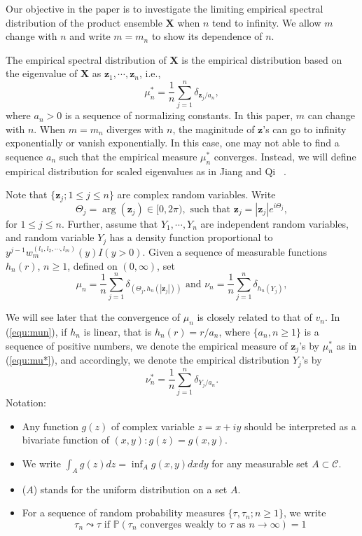 \documentclass[12pt]{article}
\theoremstyle{plain}
\theoremstyle{definition}
\theoremstyle{remark}
\begin{document}
Our objective in the paper is to investigate the limiting empirical
spectral distribution of the product ensemble $\mathbf{X}$ when $n$
tend to infinity. We allow $m$ change with $n$ and write $m=m_n$ to
show its dependence of $n$.


The empirical spectral distribution of $\mathbf{X}$ is the empirical distribution based on the eigenvalue of $\mathbf{X}$ as $\mathbf{z}_{1}, \cdots, \mathbf{z}_{n}$, i.e.,
\begin{equation}\label{equ:mu*}
\mu^*_n=\frac{1}{n}\sum_{j=1}^n \delta_{\mathbf{z}_j/a_n},
\end{equation}
where $a_n>0$ is a sequence of normalizing constants. In this paper,
$m$ can change with $n$. When $m=m_n$ diverges with $n$, the
maginitude of $\mathbf{z}$'s can go to infinity exponentially or
vanish exponentially. In this case, one may not able to find a
sequence $a_n$ such that the empirical measure $\mu_n^*$ converges.
Instead, we will define empirical distribution for scaled
eigenvalues as in Jiang and Qi ~\cite{JiangQi2019}.

Note that $\{ \mathbf{z}_j;1\leq j\leq n \}$ are complex random variables. Write
$$
\Theta_j=\arg(\mathbf{z}_j)\in[0,2\pi), \text{ such that }\mathbf{z}_j=|\mathbf{z}_j|e^{i\Theta_j},
$$
for $1\leq j\leq n$. Further, assume that $Y_1,\cdots,Y_n$ are independent random variables, and random variable $Y_j$ has a density function proportional to $y^{j-1}w_m^{(l_1,l_2,\cdots,l_m)}(y)I(y>0)$. Given a sequence of measurable functions $h_n(r)$, $n\geq 1$, defined on $(0,\infty)$, set
\begin{equation}\label{equ:mun}
\mu_{n}=\frac{1}{n} \sum_{j=1}^{n} \delta_{\left(\Theta_{j}, h_{n}\left(\left|\mathbf{z}_{j}\right|\right)\right)} \text { and } \nu_{n}=\frac{1}{n} \sum_{j=1}^{n} \delta_{h_{n}\left({Y_{j}}\right)},
\end{equation}

We will see later that the convergence of $\mu_n$ is closely related to that of $v_n$. In (\ref{equ:mun}), if $h_n$ is linear, that is $h_n(r)=r/a_n$, where $\{ a_n,n\geq 1 \}$ is a sequence of positive numbers, we denote the empirical measure of $\mathbf{z}_j$'s by $\mu_n^*$ as in (\ref{equ:mu*}), and accordingly, we denote the empirical distribution $Y_j$'s by
$$
\nu_n^*=\frac{1}{n} \sum_{j=1}^{n} \delta_{{Y_{j}}/a_n}.
$$
Notation:
\begin{itemize}
    \item Any function $g(z)$ of complex variable $z=x+iy$ should be interpreted as a bivariate function of $(x,y):g(z)=g(x,y)$.
    \item We write $\int_Ag(z)dz=\inf_Ag(x,y)dxdy$ for any measurable set $A\subset \mathcal{C}$.
    \item {}($A$) stands for the uniform distribution on a set $A$.
    \item For a sequence of random probability measures $\{ \tau,\tau_n;n\geq 1 \}$, we write
    \begin{equation}\label{equ:leadsto converge}
    \tau_{n} \leadsto \tau \text { if } \mathbb{P}\left(\tau_{n} \text { converges weakly to } \tau \text { as } n \rightarrow \infty\right)=1
    \end{equation}
\end{itemize}
\end{document}
